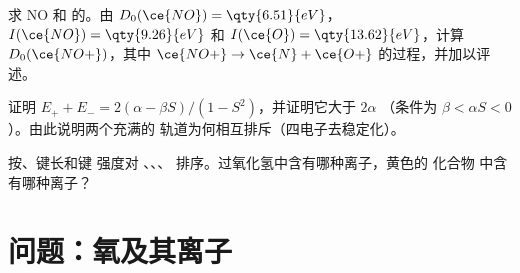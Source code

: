 \begin{exercise}[$\star\star\star$]\label{exo:b2:diatomic-mos:10}
求 NO 和  的。由 $D_0(\ce{NO}) = \qty{6.51}{eV}$，$I(\ce{NO}) =
\qty{9.26}{eV}$ 和 $I(\ce{O}) = \qty{13.62}{eV}$，计算 $D_0(\ce{NO+})$，其中 $\ce{NO+} \to
\ce{N} + \ce{O+}$ 的过程，并加以评述。
\end{exercise}

\begin{exercise}[$\star\star\star$]\label{exo:b2:diatomic-mos:11}
证明 $E_+ + E_- = 2(\alpha - \beta S)/(1 - S^2)$，并证明它大于 $2\alpha$
（条件为 $\beta < \alpha S < 0$）。由此说明两个充满的
轨道为何相互排斥（四电子去稳定化）。
\end{exercise}

\begin{exercise}[$\star\star\star$]\label{exo:b2:diatomic-mos:12}
按、键长和键
强度对 、、、 排序。过氧化氢中含有哪种离子，黄色的
化合物  中含有哪种离子？
\end{exercise}

\section{问题：氧及其离子}

